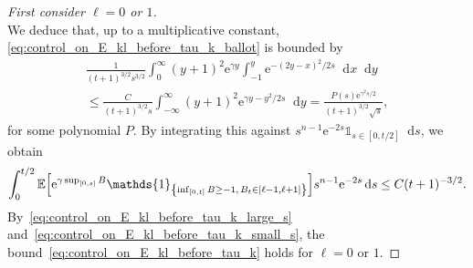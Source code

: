 \documentclass[AHL,Unicode,longabstracts,published]{cedram}
\newcommand{\e}{\mathrm{e}}
\renewcommand{\d}[1]{\mathop{}\!\mathrm{d}#1}
\newcommand{\E}{\mathbb{E}}
\newcommand\1{\mathds{1}}
\let\originalleft\left
\let\originalright\right
\renewcommand{\left}{\mathopen{}\mathclose\bgroup\originalleft}
\renewcommand{\right}{\aftergroup\egroup\originalright}
\begin{document}
\begin{proofc}
\begin{proof}[{First consider $\ell = 0$ or $1$}]
\begin{equation}
\end{equation}
We deduce that, up to a multiplicative constant, \eqref{eq:control_on_E_kl_before_tau_k_ballot} is bounded by
\begin{multline}
\frac{1}{(t + 1)^{3/2} s^{3/2}} \int_0^\infty (y + 1)^2 \e^{\gamma y} \int_{-1}^y \e^{-(2y - x)^2/2s} \d{x} \d{y}  \\
\leq \frac{C}{(t + 1)^{3/2} s} \int_{-\infty}^\infty (y + 1)^2 \e^{\gamma y - y^2/2s} \d{y} = \frac{P(s) \e^{\gamma^2 s/2}}{(t + 1)^{3/2} \sqrt{s}},
\end{multline}
for some polynomial $P$. By integrating this against $s^{n-1} \e^{-2s} \1_{s \in [0, t/2]} \d{s}$, we obtain
\begin{equation}\label{eq:control_on_E_kl_before_tau_k_small_s}
\int_0^{t/2} \E \left[\e^{\gamma \sup_{[0, s]} B} \1_{\left\{\inf_{[0, t]} B \geq -1,\, B_t \in [\ell-1, \ell+1]\right\}} \right] s^{n-1} \e^{-2s} \d{s} \leq C (t + 1)^{-3/2}.
\end{equation}
By~\eqref{eq:control_on_E_kl_before_tau_k_large_s} and~\eqref{eq:control_on_E_kl_before_tau_k_small_s}, the bound~\eqref{eq:control_on_E_kl_before_tau_k} holds for $\ell = 0$ or $1$.
\let\qed\relax
\end{proof}


\end{proofc}
\end{document}
